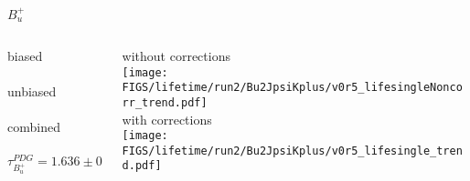 \begin{frame}{$B_u^+$}
  
  \begin{columns}
  
    \begin{column}{0.45\textwidth}
      {\color{scqorange}biased} \\[2mm]
      \resizebox{\textwidth}{!}{}\\[5mm]
      {\color{scqred}unbiased} \\[2mm]
      \resizebox{\textwidth}{!}{}\\[5mm]
      {\color{scqgreen}combined} \\[2mm]
      \resizebox{\textwidth}{!}{}\\
      \begin{equation*}
        \tau_{B_u^+}^{PDG} = 1.636 \pm 0.007
      \end{equation*}
    \end{column}
  
    \begin{column}{0.45\textwidth}
      \footnotesize
      {without corrections}\\[2mm]
      \texttt{[image: \\FIGS/lifetime/run2/Bu2JpsiKplus/v0r5\_lifesingleNoncorr\_trend.pdf]}\\[3mm]
      {with corrections}\\[2mm]
      \texttt{[image: \\FIGS/lifetime/run2/Bu2JpsiKplus/v0r5\_lifesingle\_trend.pdf]}
    \end{column}
  
  \end{columns}

\end{frame}



